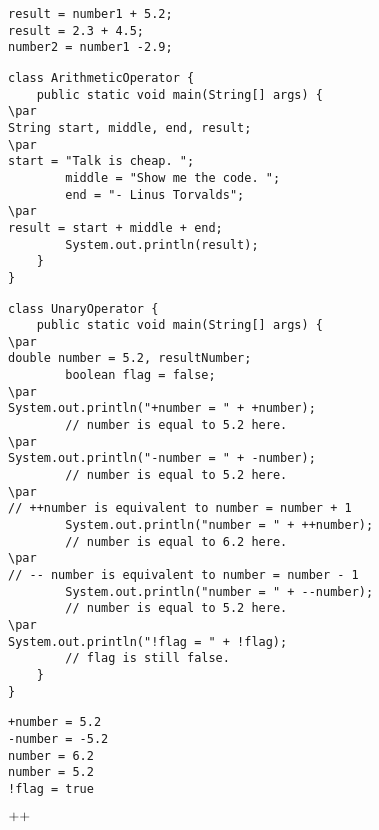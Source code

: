 \documentclass{book}
\def\lthtmlcheckvsize{\ifdim\ht\sizebox<\vsize 
  \ifdim\wd\sizebox<\hsize\expandafter\hfill\fi \expandafter\vfill
  \else\expandafter\vss\fi}%
\begin{document}
{\newpage\clearpage
{}%
\begin{lstlisting}
result = number1 + 5.2;
result = 2.3 + 4.5;
number2 = number1 -2.9;
\end{lstlisting}%
\lthtmlfigureZ
\lthtmlcheckvsize\clearpage}

{\newpage\clearpage
{}%
\begin{lstlisting}
class ArithmeticOperator {
    public static void main(String[] args) {
\par
String start, middle, end, result;
\par
start = "Talk is cheap. ";
        middle = "Show me the code. ";
        end = "- Linus Torvalds";
\par
result = start + middle + end;
        System.out.println(result);
    }
}
\end{lstlisting}%
\lthtmlfigureZ
\lthtmlcheckvsize\clearpage}

{\newpage\clearpage
{}%
\begin{lstlisting}
class UnaryOperator {
    public static void main(String[] args) {
\par
double number = 5.2, resultNumber;
        boolean flag = false;
\par
System.out.println("+number = " + +number);
        // number is equal to 5.2 here.
\par
System.out.println("-number = " + -number);
        // number is equal to 5.2 here.
\par
// ++number is equivalent to number = number + 1
        System.out.println("number = " + ++number);
        // number is equal to 6.2 here.
\par
// -- number is equivalent to number = number - 1
        System.out.println("number = " + --number);
        // number is equal to 5.2 here.
\par
System.out.println("!flag = " + !flag);
        // flag is still false.
    }
}
\end{lstlisting}%
\lthtmlfigureZ
\lthtmlcheckvsize\clearpage}

{\newpage\clearpage
{}%
\begin{lstlisting}
+number = 5.2
-number = -5.2
number = 6.2
number = 5.2
!flag = true
\end{lstlisting}%
\lthtmlfigureZ
\lthtmlcheckvsize\clearpage}

{\newpage\clearpage
{}%
$\lstinline{++}$%
\lthtmlindisplaymathZ
\lthtmlcheckvsize\clearpage}
\end{document}
